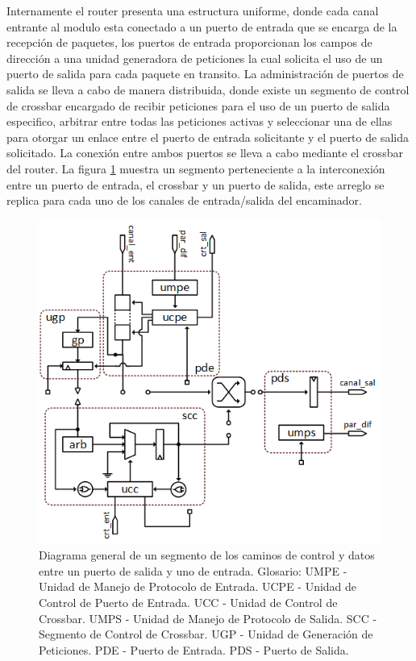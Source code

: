 Internamente el router presenta una estructura uniforme, donde cada canal entrante al modulo esta conectado a un puerto de entrada que se encarga de la recepción de paquetes, los puertos de entrada proporcionan los campos de dirección a una unidad generadora de peticiones la cual solicita el uso de un puerto de salida para cada paquete en transito. La administración de puertos de salida se lleva a cabo de manera distribuida, donde existe un segmento de control de crossbar encargado de recibir peticiones para el uso de un puerto de salida especifico, arbitrar entre todas las peticiones activas y seleccionar una de ellas para otorgar un enlace entre el puerto de entrada solicitante y el puerto de salida solicitado. La conexión entre ambos puertos se lleva a cabo mediante el crossbar del router. La figura \ref{fig:ch4_slice_arq} muestra un segmento perteneciente a la interconexión entre un puerto de entrada, el crossbar y un puerto de salida, este arreglo se replica para cada uno de los canales de entrada/salida del encaminador.

\begin{figure}
	\begin{center}
		\includegraphics[scale=0.7]{figures/ch4_slice_arq.png}
	\end{center}
	\caption
		{	
			Diagrama general de un segmento de los caminos de control y datos entre un puerto de salida y uno de entrada. Glosario: UMPE - Unidad de Manejo de Protocolo de Entrada. UCPE - Unidad de Control de Puerto de Entrada. UCC - Unidad de Control de Crossbar. UMPS - Unidad de Manejo de Protocolo de Salida. SCC - Segmento de Control de Crossbar. UGP - Unidad de Generación de Peticiones. PDE - Puerto de Entrada. PDS - Puerto de Salida. 
		}
	\label{fig:ch4_slice_arq}
\end{figure}

